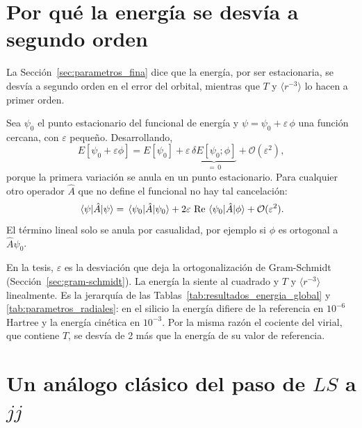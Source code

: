 \documentclass[11pt,a4paper]{article}
\begin{document}
\section{Por qué la energía se desvía a segundo orden}
\label{det:segundo_orden}

La Sección~\ref{sec:parametros_fina} dice que la energía, por ser estacionaria, se desvía a segundo
orden en el error del orbital, mientras que $T$ y $\langle r^{-3}\rangle$ lo hacen a primer orden.

Sea $\psi_0$ el punto estacionario del funcional de energía y $\psi = \psi_0 + \varepsilon\,\phi$ una
función cercana, con $\varepsilon$ pequeño. Desarrollando,
\begin{equation}
  E[\psi_0 + \varepsilon\phi] = E[\psi_0]
  + \varepsilon\,\underbrace{\delta E[\psi_0;\phi]}_{=\,0}
  + \mathcal{O}(\varepsilon^2),
\end{equation}
porque la primera variación se anula en un punto estacionario. Para cualquier otro operador $\hat{A}$
que no define el funcional no hay tal cancelación:
\begin{equation}
  \ev{\hat{A}}{\psi} = \ev{\hat{A}}{\psi_0} + 2\varepsilon\,\Re\mel{\psi_0}{\hat{A}}{\phi}
  + \mathcal{O}(\varepsilon^2).
\end{equation}
El término lineal solo se anula por casualidad, por ejemplo si $\phi$ es ortogonal a
$\hat{A}\psi_0$.

En la tesis, $\varepsilon$ es la desviación que deja la ortogonalización de Gram-Schmidt
(Sección~\ref{sec:gram-schmidt}). La energía la siente al cuadrado y $T$ y $\langle r^{-3}\rangle$
linealmente. Es la jerarquía de las Tablas~\ref{tab:resultados_energia_global} y
\ref{tab:parametros_radiales}: en el silicio la energía difiere de la referencia en $10^{-6}$ Hartree
y la energía cinética en $10^{-3}$. Por la misma razón el cociente del virial, que contiene $T$,
se desvía de 2 más que la energía de su valor de referencia.

\section{Un análogo clásico del paso de \texorpdfstring{$LS$}{LS} a \texorpdfstring{$jj$}{jj}}
\label{det:clasico}
\end{document}
